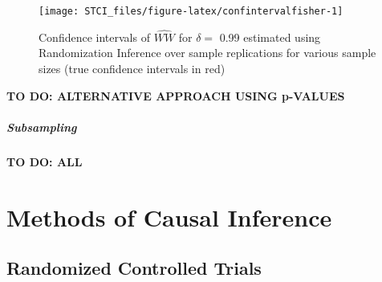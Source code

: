 \documentclass[]{book}
\newenvironment{Shaded}{\begin{snugshade}}{\end{snugshade}}
\newcommand{\KeywordTok}[1]{\textcolor[rgb]{0.13,0.29,0.53}{\textbf{#1}}}
\newcommand{\DataTypeTok}[1]{\textcolor[rgb]{0.13,0.29,0.53}{#1}}
\newcommand{\DecValTok}[1]{\textcolor[rgb]{0.00,0.00,0.81}{#1}}
\newcommand{\StringTok}[1]{\textcolor[rgb]{0.31,0.60,0.02}{#1}}
\newcommand{\OperatorTok}[1]{\textcolor[rgb]{0.81,0.36,0.00}{\textbf{#1}}}
\newcommand{\NormalTok}[1]{#1}
\theoremstyle{definition}
\theoremstyle{definition}
\theoremstyle{definition}
\theoremstyle{remark}
\begin{document}
\begin{Shaded}
\end{Shaded}

\begin{figure}[htbp]

{\centering \texttt{[image: STCI\_files/figure-latex/confintervalfisher-1]} 

}

\caption{Confidence intervals of $\hat{WW}$ for $\delta=$ 0.99 estimated using Randomization Inference over sample replications for various sample sizes (true confidence intervals in red)}\label{fig:confintervalfisher}
\end{figure}

\textbf{TO DO: ALTERNATIVE APPROACH USING p-VALUES}

\subsubsection{Subsampling}\label{subsampling}

\textbf{TO DO: ALL}

\part{Methods of Causal
Inference}\label{part-methods-of-causal-inference}

\chapter{Randomized Controlled Trials}\label{RCT}
\end{document}
